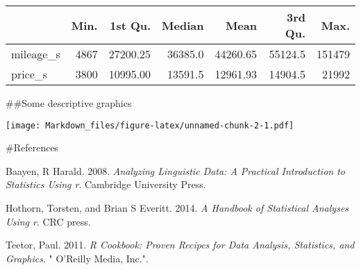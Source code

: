 \documentclass[
]{article}
\newenvironment{Shaded}{\begin{snugshade}}{\end{snugshade}}
\newcommand{\AttributeTok}[1]{\textcolor[rgb]{0.77,0.63,0.00}{#1}}
\newcommand{\DecValTok}[1]{\textcolor[rgb]{0.00,0.00,0.81}{#1}}
\newcommand{\FloatTok}[1]{\textcolor[rgb]{0.00,0.00,0.81}{#1}}
\newcommand{\FunctionTok}[1]{\textcolor[rgb]{0.00,0.00,0.00}{#1}}
\newcommand{\NormalTok}[1]{#1}
\newcommand{\OtherTok}[1]{\textcolor[rgb]{0.56,0.35,0.01}{#1}}
\newcommand{\SpecialCharTok}[1]{\textcolor[rgb]{0.00,0.00,0.00}{#1}}
\newcommand{\StringTok}[1]{\textcolor[rgb]{0.31,0.60,0.02}{#1}}
\newlength{\cslhangindent}
\newenvironment{CSLReferences}[2] %
 {%
  \setlength{\parindent}{0pt}
  \ifodd #1 \everypar{\setlength{\hangindent}{\cslhangindent}}\ignorespaces\fi
  \ifnum #2 > 0
  \setlength{\parskip}{#2\baselineskip}
  \fi
 }%
 {}
\begin{document}
\begin{longtable}[]{@{}lrrrrrr@{}}
\toprule
& Min. & 1st Qu. & Median & Mean & 3rd Qu. & Max. \\
\midrule
\endhead
mileage\_s & 4867 & 27200.25 & 36385.0 & 44260.65 & 55124.5 & 151479 \\
price\_s & 3800 & 10995.00 & 13591.5 & 12961.93 & 14904.5 & 21992 \\
\bottomrule
\end{longtable}

\#\#Some descriptive graphics

\begin{Shaded}
\end{Shaded}

\texttt{[image: Markdown\_files/figure-latex/unnamed-chunk-2-1.pdf]}

\#References

\hypertarget{refs}{}
\begin{CSLReferences}{1}{0}
\leavevmode{}%
Baayen, R Harald. 2008. \emph{Analyzing Linguistic Data: A Practical
Introduction to Statistics Using r}. Cambridge University Press.

\leavevmode{}%
Hothorn, Torsten, and Brian S Everitt. 2014. \emph{A Handbook of
Statistical Analyses Using r}. CRC press.

\leavevmode{}%
Teetor, Paul. 2011. \emph{R Cookbook: Proven Recipes for Data Analysis,
Statistics, and Graphics}. " O'Reilly Media, Inc.".

\end{CSLReferences}
\end{document}
